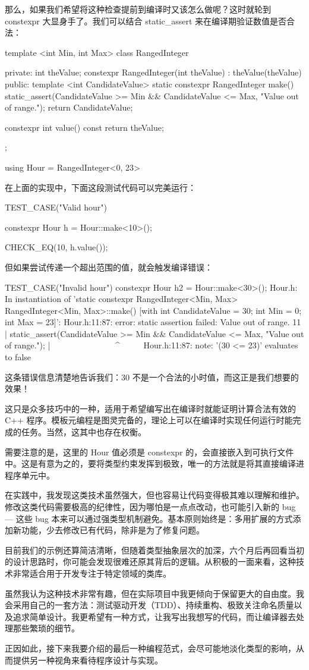 那么，如果我们希望将这种检查提前到编译时又该怎么做呢？这时就轮到 constexpr 大显身手了。我们可以结合 static\_assert 来在编译期验证数值是否合法：

\begin{cpp}
template <int Min, int Max>
class RangedInteger{
private:
  int theValue;
  constexpr RangedInteger(int theValue) : theValue(theValue) {}
public:
  template <int CandidateValue>
  static constexpr RangedInteger make() {
    static_assert(CandidateValue >= Min && CandidateValue <= Max, "Value out of range.");
    return CandidateValue;
  }

  constexpr int value() const {
    return theValue;
  }
};

using Hour = RangedInteger<0, 23>
\end{cpp}

在上面的实现中，下面这段测试代码可以完美运行：

\begin{cpp}
TEST_CASE("Valid hour"){
  constexpr Hour h = Hour::make<10>();

  CHECK_EQ(10, h.value());
}
\end{cpp}

但如果尝试传递一个超出范围的值，就会触发编译错误：

\begin{shell}
TEST_CASE("Invalid hour"){
  constexpr Hour h2 = Hour::make<30>();
}
Hour.h: In instantiation of 'static constexpr RangedInteger<Min, Max>
RangedInteger<Min, Max>::make() [with int CandidateValue = 30; int Min
= 0; int Max = 23]':
Hour.h:11:87: error: static assertion failed: Value out of range.
   11 | static_assert(CandidateValue >= Min && CandidateValue <= Max, "Value out of range.");
      |                                        ~~~~~~~~~~~~~~~^~~~~~
Hour.h:11:87: note: '(30 <= 23)' evaluates to false
\end{shell}

这条错误信息清楚地告诉我们：30 不是一个合法的小时值，而这正是我们想要的效果！

这只是众多技巧中的一种，适用于希望编写出在编译时就能证明计算合法有效的 C++ 程序。模板元编程是图灵完备的，理论上可以在编译时实现任何运行时能完成的任务。当然，这其中也存在权衡。

需要注意的是，这里的 Hour 值必须是 constexpr 的，会直接嵌入到可执行文件中。这是有意为之的，要将类型约束发挥到极致，唯一的方法就是将其直接编译进程序单元中。

在实践中，我发现这类技术虽然强大，但也容易让代码变得极其难以理解和维护。修改这类代码需要极高的纪律性，因为哪怕是一点点改动，也可能引入新的 bug --- 这些 bug 本来可以通过强类型机制避免。基本原则始终是：多用扩展的方式添加新功能，少去修改已有代码，除非是为了修复问题。

目前我们的示例还算简洁清晰，但随着类型抽象层次的加深，六个月后再回看当初的设计思路时，你可能会发现很难还原其背后的逻辑。从积极的一面来看，这种技术非常适合用于开发专注于特定领域的类库。

虽然我认为这种技术非常有趣，但在实际项目中我更倾向于保留更大的自由度。我会采用自己的一套方法：测试驱动开发（TDD）、持续重构、极致关注命名质量以及追求简单设计。我更希望有一种方式，让我写出我想写的代码，而让编译器去处理那些繁琐的细节。

正因如此，接下来我要介绍的最后一种编程范式，会尽可能地淡化类型的影响，从而提供另一种视角来看待程序设计与实现。